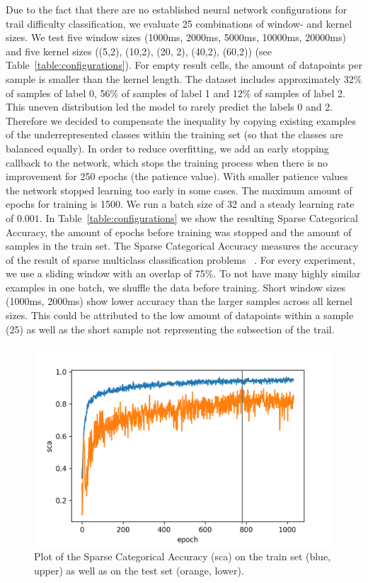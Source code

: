 \documentclass[runningheads]{llncs}
\begin{document}
Due to the fact that there are no established neural network configurations for trail difficulty classification, we evaluate 25 combinations of window- and kernel sizes.
We test five window sizes (1000ms, 2000ms, 5000ms, 10000ms, 20000ms) and five kernel sizes ((5,2), (10,2), (20, 2), (40,2), (60,2)) (see Table~\ref{table:configurations}).
For empty result cells, the amount of datapoints per sample is smaller than the kernel length.
The dataset includes approximately 32\% of samples of label 0, 56\% of samples of label 1 and 12\% of samples of label 2.
This uneven distribution led the model to rarely predict the labels 0 and 2.
Therefore we decided to compensate the inequality by copying existing examples of the underrepresented classes within the training set (so that the classes are balanced equally).
In order to reduce overfitting, we add an early stopping callback to the network, which stops the training process when there is no improvement for 250 epochs (the patience value).
With smaller patience values the network stopped learning too early in some cases.
The maximum amount of epochs for training is 1500.
We run a batch size of 32 and a steady learning rate of $0.001$.
In Table~\ref{table:configurations} we show the resulting Sparse Categorical Accuracy, the amount of epochs before training was stopped and the amount of samples in the train set.
The Sparse Categorical Accuracy measures the accuracy of the result of sparse multiclass classification problems ~\cite{moolayil2019keras}.
For every experiment, we use a sliding window with an overlap of 75\%.
To not have many highly similar examples in one batch, we shuffle the data before training.
Short window sizes (1000ms, 2000ms) show lower accuracy than the larger samples across all kernel sizes.
This could be attributed to the low amount of datapoints within a sample (25) as well as the short sample not representing the subsection of the trail.

\begin{figure}
\vspace{-5mm}
\centering
\includegraphics[width=\textwidth]{accuracy_plot.png}
\caption{Plot of the Sparse Categorical Accuracy (sca) on the train set (blue, upper) as well as on the test set (orange, lower).}
\label{fig4}	
\end{figure} 
\end{document}
